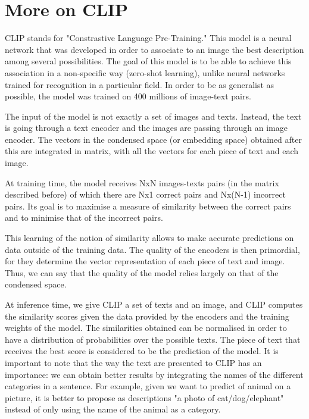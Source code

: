 \documentclass{article}
\begin{document}
\begin{appendix}
\begin{multicols}{2}
\end{multicols}

\section{More on CLIP} \label{app:more-CLIP}

CLIP stands for "Constrastive Language Pre-Training." This model is a neural network that was developed in order to associate to an image the best description among several possibilities. The goal of this model is to be able to achieve this association in a non-specific way (zero-shot learning), unlike neural networks trained for recognition in a particular field. In order to be as generalist as possible, the model was trained on 400 millions of image-text pairs. 

The input of the model is not exactly a set of images and texts. Instead, the text is going through a text encoder and the images are passing through an image encoder. The vectors in the condensed space (or embedding space) obtained after this are integrated in matrix, with all the vectors for each piece of text and each image.

At training time, the model receives NxN images-texts pairs (in the matrix described before) of which there are Nx1 correct pairs and Nx(N-1) incorrect pairs. Its goal is to maximise a measure of similarity between the correct pairs and to minimise that of the incorrect pairs. 

This learning of the notion of similarity allows to make accurate predictions on data outside of the training data. The quality of the encoders is then primordial, for they determine the vector representation of each piece of text and image. Thus, we can say that the quality of the model relies largely on that of the condensed space. 

At inference time, we give CLIP a set of texts and an image, and CLIP computes the similarity scores given the data provided by the encoders and the training weights of the model. The similarities obtained can be normalised in order to have a distribution of probabilities over the possible texts. The piece of text that receives the best score is considered to be the prediction of the model. It is important to note that the way the text are presented to CLIP has an importance: we can obtain better results by integrating the names of the different categories in a sentence. For example, given we want to predict of animal on a picture, it is better to propose as descriptions "a photo of cat/dog/elephant" instead of only using the name of the animal as a category. 


\end{appendix}
\end{document}
